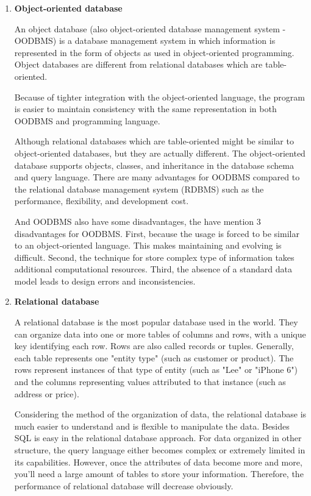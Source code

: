 \begin{enumerate}
	\item\textbf{Object-oriented database}
	\setlength{\parindent}{1em}
	
	
	An object database (also object-oriented database management system - OODBMS) is a database management system in which information is represented in the form of objects as used in object-oriented programming. Object databases are different from relational databases which are table-oriented.
	
	Because of tighter integration with the object-oriented language, the program is easier to maintain consistency with the same representation in both OODBMS and programming language.
	
	Although relational databases which are table-oriented might be similar to object-oriented databases, but they are actually different. The object-oriented database supports objects, classes, and inheritance in the database schema and query language.
	There are many advantages for OODBMS compared to the relational database management system (RDBMS) such as the performance, flexibility, and development cost.
	
	And OODBMS also have some disadvantages, the have mention 3 disadvantages for OODBMS. First, because the usage is forced to be similar to an object-oriented language. This makes maintaining and evolving is difficult. Second, the technique for store complex type of information takes additional computational resources. Third, the absence of a standard data model leads to design errors and inconsistencies.
	
	
	\item\textbf{Relational database}
	\setlength{\parindent}{1em}
	
	A relational database is the most popular database used in the world. 
	They can organize data into one or more tables of columns and rows, with a unique key identifying each row. 
	Rows are also called records or tuples. 
	Generally, each table represents one "entity type" (such as customer or product). 
	The rows represent instances of that type of entity (such as "Lee" or "iPhone 6") and the columns representing values attributed to that instance (such as address or price).
	
	Considering the method of the organization of data, the relational database is much easier to understand and is flexible to manipulate the data. 
	Besides SQL is easy in the relational database approach. 
	For data organized in other structure, the query language either becomes complex or extremely limited in its capabilities. 
	However, once the attributes of data become more and more, you'll need a large amount of tables to store your information. 
	Therefore, the performance of relational database will decrease obviously.
	

\end{enumerate}
